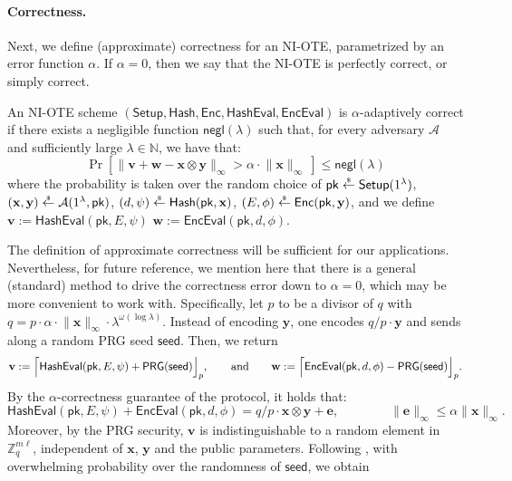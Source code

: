 \documentclass{article}
\newcommand{\getsr}{\overset{\raisebox{-1pt}{$\scriptscriptstyle \$$}}{\gets}}
\newcommand{\sample}{\getsr}
\newcommand{\N}{\mathbb{N}}
\newcommand{\Z}{\mathbb{Z}}
\newcommand{\negl}{\mathsf{negl}}
\renewcommand{\sec}{\ensuremath{\lambda}}
\newcommand{\Adv}{\mathcal{A}}
\newcommand{\algofont}[1]{\ensuremath{\mathsf{#1}}}
\newcommand{\Enc}{{\algofont{Enc}}}
\newcommand{\Setup}{{\algofont{Setup}}}
\newcommand{\Eval}{\algofont{Eval}\xspace}
\newcommand{\Hash}{{\algofont{Hash}}}
\newcommand{\pk}{{\mathsf{pk}}}
\newcommand\bbbone{1}
\begin{document}
\paragraph{Correctness.} Next, we define (approximate) correctness for an NI-OTE, parametrized by an error function $\alpha$. If $\alpha = 0$, then we say that the NI-OTE is perfectly correct, or simply correct.
{
\begin{definition}\label{def:alphacorrect}
An NI-OTE scheme $(\Setup, \allowbreak \Hash,  \allowbreak \Enc,  \allowbreak \Hash\Eval,  \allowbreak \Enc\Eval)$ is $\alpha$-adaptively correct if 
there exists a negligible function $\negl(\sec)$ such that, for every adversary $\Adv$ and sufficiently large $\sec\in\N$, we have that:
\[
\Pr\left[\lVert\mathbf{v}+\mathbf{w}-\mathbf{x}\otimes \mathbf{y}\rVert_\infty>\alpha\cdot\lVert \mathbf{x}\rVert_\infty\ \right] \leq \negl(\sec)
\]
where the probability is taken over the random choice of $\pk\sample\Setup(\bbbone^\sec)$, $(\mathbf{x}, \mathbf{y})\sample\Adv(1^\sec, \pk)$, $(d, \psi)\sample\Hash(\pk, \mathbf{x})$, $(E, \phi)\sample\Enc(\pk, \mathbf{y})$, and we define $\mathbf{v}:= \Hash\Eval(\pk, E, \psi)$ $\mathbf{w}:= \Enc\Eval(\pk, d, \phi)$.
\end{definition}
%
The definition of approximate correctness will be sufficient for our applications. Nevertheless, for future reference, we mention here that there is a general (standard) method to drive the correctness error down to $\alpha = 0$, which may be more convenient to work with. Specifically, let $p$ to be a divisor of $q$ with $q= p\cdot \alpha\cdot\lVert \mathbf{x}\rVert_\infty\cdot\lambda^{\omega(\log \lambda)}$. Instead of encoding $\mathbf{y}$, one encodes $q/p \cdot \mathbf{y}$ and sends along a random PRG seed $\mathsf{seed}$. Then, we return \[\mathbf{v}:=\Bigl\lceil\Hash\Eval(\pk, E, \psi)+\mathsf{PRG}(\mathsf{seed})\Bigr\rfloor_p, \qquad\text{and}\qquad \mathbf{w}:=\Bigl\lceil\Enc\Eval(\pk, d, \phi)-\mathsf{PRG}(\mathsf{seed})\Bigr\rfloor_p.\] 
By the $\alpha$-correctness guarantee of the protocol, it holds that:
\[
\Hash\Eval(\pk, E, \psi) + \Enc\Eval(\pk, d, \phi) = q/p \cdot \mathbf{x} \otimes \mathbf{y} +\mathbf{e}, \qquad \qquad \lVert\mathbf{e}\rVert_\infty\le \alpha\lVert \mathbf{x}\rVert_\infty.
\]
Moreover, by the PRG security, $\mathbf{v}$ is indistinguishable to a random element in $\Z_q^{m\ell}$, independent of $\mathbf{x}$, $\mathbf{y}$ and the public parameters. Following \cite{C:DHRW16}, with overwhelming probability over the randomness of $\mathsf{seed}$, we obtain
}
\end{document}

